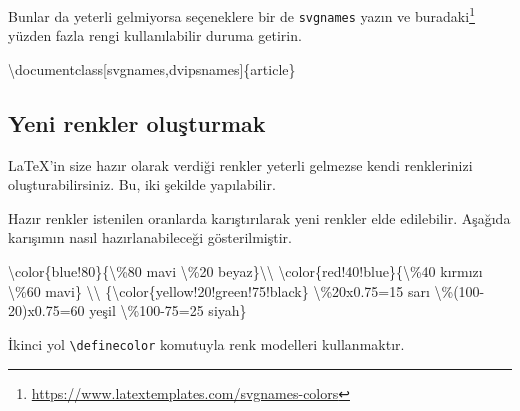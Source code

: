 \documentclass[
  10pt,
]{scrbook}
\newenvironment{Shaded}{\begin{snugshade}}{\end{snugshade}}
\newcommand{\BuiltInTok}[1]{#1}
\newcommand{\ExtensionTok}[1]{#1}
\newcommand{\FunctionTok}[1]{\textcolor[rgb]{0.00,0.00,0.00}{#1}}
\newcommand{\NormalTok}[1]{#1}
\renewcommand{\href}[2]{#2\footnote{\url{#1}}}
\theoremstyle{definition}
\theoremstyle{definition}
\theoremstyle{definition}
\theoremstyle{definition}
\theoremstyle{remark}
\begin{document}
Bunlar da yeterli gelmiyorsa seçeneklere bir de \texttt{svgnames} yazın ve \href{https://www.latextemplates.com/svgnames-colors}{buradaki} yüzden fazla rengi kullanılabilir duruma getirin.

\begin{Shaded}
\begin{Highlighting}[]
\BuiltInTok{\textbackslash{}documentclass}\NormalTok{[svgnames,dvipsnames]\{}\ExtensionTok{article}\NormalTok{\}}
\end{Highlighting}
\end{Shaded}

\hypertarget{yeni-renkler-oluux15fturmak}{%
\subsection{Yeni renkler oluşturmak}\label{yeni-renkler-oluux15fturmak}}

LaTeX'in size hazır olarak verdiği renkler yeterli gelmezse kendi renklerinizi oluşturabilirsiniz. Bu, iki şekilde yapılabilir.

Hazır renkler istenilen oranlarda karıştırılarak yeni renkler elde edilebilir. Aşağıda karışımın nasıl hazırlanabileceği gösterilmiştir.

\begin{Shaded}
\begin{Highlighting}[]
\FunctionTok{\textbackslash{}color}\NormalTok{\{blue!80\}\{}\FunctionTok{\textbackslash{}\%}\NormalTok{80 mavi }\FunctionTok{\textbackslash{}\%}\NormalTok{20 beyaz\}}\FunctionTok{\textbackslash{}\textbackslash{}}
\FunctionTok{\textbackslash{}color}\NormalTok{\{red!40!blue\}\{}\FunctionTok{\textbackslash{}\%}\NormalTok{40 kırmızı }\FunctionTok{\textbackslash{}\%}\NormalTok{60 mavi\} }\FunctionTok{\textbackslash{}\textbackslash{}}
\NormalTok{\{}\FunctionTok{\textbackslash{}color}\NormalTok{\{yellow!20!green!75!black\} }\FunctionTok{\textbackslash{}\%}\NormalTok{20x0.75=15 sarı}
\FunctionTok{\textbackslash{}\%}\NormalTok{(100{-}20)x0.75=60 yeşil }\FunctionTok{\textbackslash{}\%}\NormalTok{100{-}75=25 siyah\}}
\end{Highlighting}
\end{Shaded}

İkinci yol \texttt{\textbackslash{}definecolor} komutuyla renk modelleri kullanmaktır.
\end{document}
